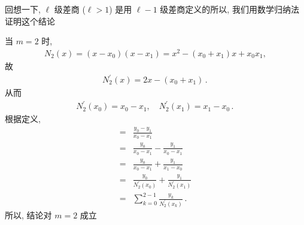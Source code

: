 \begin{pf}
    回想一下, $\ell$ 级差商 ($\ell > 1$) 是用 $\ell - 1$ 级差商定义的\period 所以, 我们用数学归纳法证明这个结论\period

    当 $m = 2$ 时,
    \begin{align*}
        N_2 (x) = (x - x_0) (x - x_1) = x^2 - (x_0 + x_1) x + x_0 x_1,
    \end{align*}
    故
    \begin{align*}
        N_2^{\prime} (x) = 2x - (x_0 + x_1) \period
    \end{align*}
    从而
    \begin{align*}
        N_2^{\prime} (x_0) = x_0 - x_1, \quad N_2^{\prime} (x_1) = x_1 - x_0 \period
    \end{align*}
    根据定义,
    \begin{align*}
        [x_0, x_1]
        = {} & \frac{y_0 - y_1}{x_0 - x_1}                                     \\
        = {} & \frac{y_0}{x_0 - x_1} - \frac{y_1}{x_0 - x_1}                   \\
        = {} & \frac{y_0}{x_0 - x_1} + \frac{y_1}{x_1 - x_0}                   \\
        = {} & \frac{y_0}{N_2^{\prime} (x_0)} + \frac{y_1}{N_2^{\prime} (x_1)} \\
        = {} & \sum_{k = 0}^{2-1} \frac{y_k}{N_2^{\prime} (x_k)} \period
    \end{align*}
    所以, 结论对 $m = 2$ 成立\period


\end{pf}
